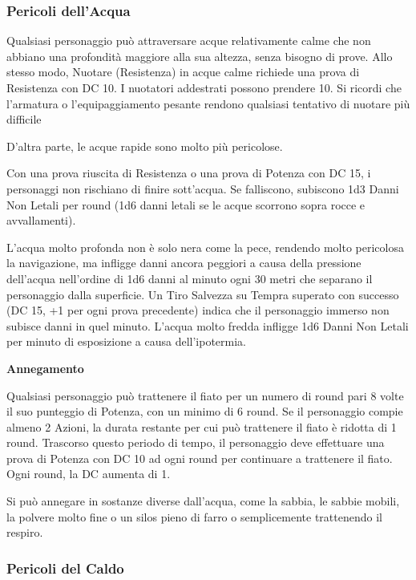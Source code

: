 \documentclass[a4paper,11pt,twoside,openany]{book}
\begin{document}
\subsubsection{Pericoli dell'Acqua}

\label{pericoli-dellacqua}

Qualsiasi personaggio può attraversare acque relativamente calme che non abbiano una profondità maggiore alla sua altezza, senza bisogno di prove. Allo stesso modo, Nuotare (Resistenza) in acque calme richiede una prova di Resistenza con DC 10. I nuotatori addestrati possono prendere 10. Si ricordi che l'armatura o l'equipaggiamento pesante rendono qualsiasi tentativo di nuotare più difficile

D'altra parte, le acque rapide sono molto più pericolose.

Con una prova riuscita di Resistenza o una prova di Potenza con DC 15, i personaggi non rischiano di finire sott'acqua. Se falliscono, subiscono 1d3 Danni Non Letali per round (1d6 danni letali se le acque scorrono sopra rocce e avvallamenti).

L'acqua molto profonda non è solo nera come la pece, rendendo molto pericolosa la navigazione, ma infligge danni ancora peggiori a causa della pressione dell'acqua nell'ordine di 1d6 danni al minuto ogni 30 metri che separano il personaggio dalla superficie. Un Tiro Salvezza su Tempra superato con successo (DC 15, +1 per ogni prova precedente) indica che il personaggio immerso non subisce danni in quel minuto. L'acqua molto fredda infligge 1d6 Danni Non Letali per minuto di esposizione a causa dell'ipotermia.

\textbf{Annegamento}

Qualsiasi personaggio può trattenere il fiato per un numero di round pari 8 volte il suo punteggio di Potenza, con un minimo di 6 round. Se il personaggio compie almeno 2 Azioni, la durata restante per cui può trattenere il fiato è ridotta di 1 round. Trascorso questo periodo di tempo, il personaggio deve effettuare una prova di Potenza con DC 10 ad ogni round per continuare a trattenere il fiato. Ogni round, la DC aumenta di 1.

Si può annegare in sostanze diverse dall'acqua, come la sabbia, le sabbie mobili, la polvere molto fine o un silos pieno di farro o semplicemente trattenendo il respiro.

\subsubsection{Pericoli del Caldo}
\end{document}
